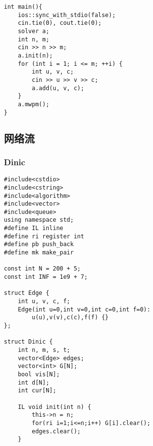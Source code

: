 \documentclass[UTF8]{ctexart}
\begin{document}
\begin{framed}
\begin{lstlisting}
int main(){
    ios::sync_with_stdio(false);
    cin.tie(0), cout.tie(0);
    solver a;
    int n, m;
    cin >> n >> m;
    a.init(n);
    for (int i = 1; i <= m; ++i) {
        int u, v, c;
        cin >> u >> v >> c;
        a.add(u, v, c);
    }
    a.mwpm();
}
\end{lstlisting}
\end{framed}

\subsection{网络流}
\subsubsection{Dinic}
\begin{framed}
\begin{lstlisting}
#include<cstdio>
#include<cstring>
#include<algorithm>
#include<vector>
#include<queue>
using namespace std;
#define IL inline
#define ri register int 
#define pb push_back
#define mk make_pair

const int N = 200 + 5;
const int INF = 1e9 + 7;

struct Edge {
    int u, v, c, f;
    Edge(int u=0,int v=0,int c=0,int f=0):
        u(u),v(v),c(c),f(f) {}
};

struct Dinic {
    int n, m, s, t;
    vector<Edge> edges;
    vector<int> G[N];
    bool vis[N];
    int d[N];
    int cur[N];
    
    IL void init(int n) {
        this->n = n;
        for(ri i=1;i<=n;i++) G[i].clear();
        edges.clear();
    }
    

\end{lstlisting}
\end{framed}
\end{document}
